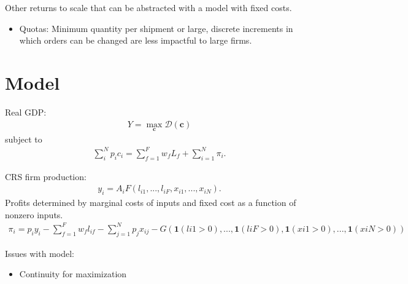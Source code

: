 \documentclass{article}
\begin{document}
Other returns to scale that can be abstracted with a model with fixed costs.
\begin{itemize}
    \item Quotas: Minimum quantity per shipment or large, discrete increments in which orders can be changed are less impactful to large firms.
\end{itemize}

\section{Model}
Real GDP:
\begin{align*}
    Y = \max_{\mathbf{c}}\mathcal{D}(\mathbf{c})
\end{align*}
subject to
\begin{align*}
    \sum_i^N p_ic_i = \sum_{f=1}^F w_f L_f + \sum_{i=1}^N \pi_i.
\end{align*}

CRS firm production:
\begin{align*}
    y_i = A_i F(l_{i1},...,l_{iF},x_{i1},...,x_{iN}).
\end{align*}
Profits determined by marginal costs of inputs and fixed cost as a function of nonzero inputs.
\begin{align*}
    \pi_i = p_i y_i - \sum_{f=1}^F w_f l_{if} - \sum_{j=1}^N p_j x_{ij} - G(\mathbf{1}(li1>0),...,\mathbf{1}(liF>0),\mathbf{1}(xi1>0),...,\mathbf{1}(xiN>0))
\end{align*}

Issues with model:
\begin{itemize}
    \item Continuity for maximization
\end{itemize}
\end{document}
